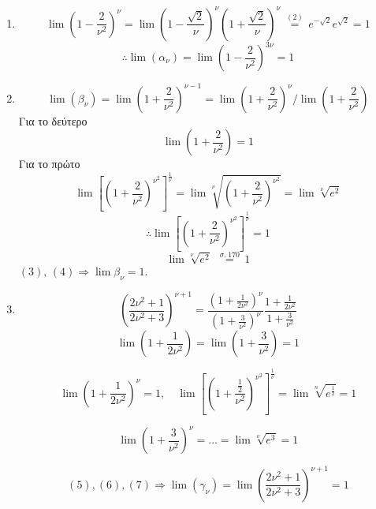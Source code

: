 \documentclass[a4paper]{article}
\numberwithin{equation}{section} %
\newcounter{set}
\renewcommand{\a}{\alpha}
\newcommand{\n}{\nu}
\begin{document}
\begin{enumerate}[label=\roman*)]
    \item
    \[
    \lim {{\left( 1-\frac{2}{{{\n}^{2}}} \right)}^{\n}}=\lim {{\left( 1-\frac{\sqrt{2}}{\n} \right)}^{\n}}{{\left( 1+\frac{\sqrt{2}}{\n} \right)}^{\n}}\ 
    \overset{(2)}{\mathop{=}} \,{{e}^{-\sqrt{2}}}{{e}^{\sqrt{2}}}=1
    \]
    \[
    \therefore \lim \left( {{\a}_{\n}} \right)=\lim {{\left( 1-\frac{2}{{{\n}^{2}}} \right)}^{3\n}}=1
    \]
    \item 
    \[
    \lim \left( {{\beta }_{\n}} \right)={\lim{\left( 1+\frac{2}{{{\n}^{2}}} \right)}^{\n-1}}={\lim{\left( 1+\frac{2}{{{\n}^{2}}} \right)}^{\n}}/\lim\left( 1+\frac{2}{{{\n}^{2}}} \right)
    \]
    Για το δεύτερο
    \[
    \lim\left( 1+\frac{2}{{{\n}^{2}}} \right) = 1
    \tag{3}
    \]
    Για το πρώτο
    \[
    \lim {{\left[ {{\left( 1+\frac{2}{{{\n}^{2}}} \right)}^{{{\n}^{2}}}} \right]}^{\frac{1}{\n}}}=\lim \sqrt[\n]{{{\left( 1+\frac{2}{{{\n}^{2}}} \right)}^{{{\n}^{2}}}}}=\lim \sqrt[\n]{{{e}^{2}}}
    \]
    \[
    \therefore \lim {{\left[ {{\left( 1+\frac{2}{{{\n}^{2}}} \right)}^{{{\n}^{2}}}} \right]}^{\frac{1}{\n}}}=1 \tag{4}
    \]
    \[
    \lim \sqrt[\n]{{{e}^{2}}}\ \ \overset{\sigma .\ 170}{\mathop{=}}\,1
    \]
    $(3),\, (4) \Rightarrow \lim \beta_\n = 1$.
    
    \item
    \[{{\left( \frac{2{{\n}^{2}}+1}{2{{\n}^{2}}+3} \right)}^{\n+1}}=\frac{{{\left( 1+\frac{1}{2{{\n}^{2}}} \right)}^{\n}}}{{{\left( 1+\frac{3}{{{\n}^{2}}} \right)}^{\n}}}\frac{1+\frac{1}{2{{\n}^{2}}}}{1+\frac{3}{{{\n}^{2}}}}\]
    \[\lim \left( 1+\frac{1}{2{{\n}^{2}}} \right)=\lim \left( 1+\frac{3}{{{\n}^{2}}} \right)=1 \tag{5}\]
    
    \[\lim {{\left( 1+\frac{1}{2{{\n}^{2}}} \right)}^{\n}}=1, \quad \lim {{\left[ {{\left( 1+\frac{\frac{1}{2}}{{{\n}^{2}}} \right)}^{{{\n}^{2}}}} \right]}^{\frac{1}{\n}}}=\lim \sqrt[n]{{{e}^{\frac{1}{2}}}}=1 \tag{6}\]
    
    \[\lim {{\left( 1+\frac{3}{{{\n}^{2}}} \right)}^{\n}}=\ldots=\lim \sqrt[\n]{{{e}^{3}}}=1 \tag{7}\]
    
    \[\left( 5 \right),\left( 6 \right),\left( 7 \right)\Rightarrow \lim \left( {{\gamma }_{\n}} \right)=\lim {{\left( \frac{2{{\n}^{2}}+1}{2{{\n}^{2}}+3} \right)}^{\n+1}}=1\]
    
    
\end{enumerate}
\end{document}
